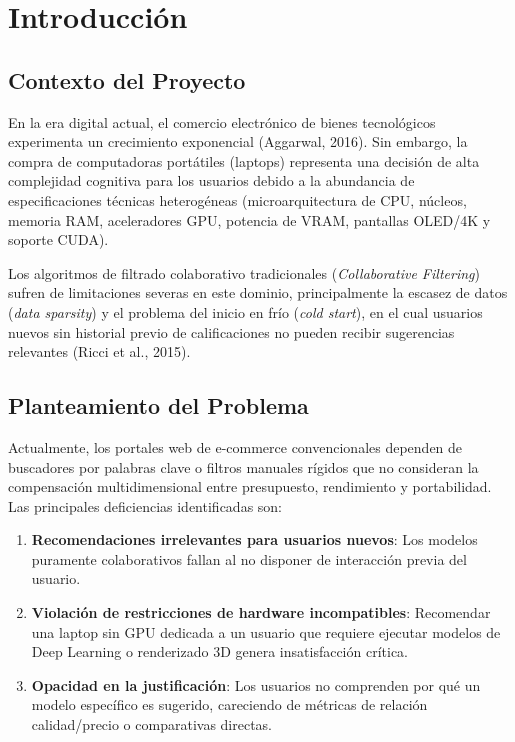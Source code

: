 \documentclass[12pt,a4paper]{article}
\begin{document}
\section{Introducción}

\subsection{Contexto del Proyecto}
En la era digital actual, el comercio electrónico de bienes tecnológicos experimenta un crecimiento exponencial (Aggarwal, 2016). Sin embargo, la compra de computadoras portátiles (laptops) representa una decisión de alta complejidad cognitiva para los usuarios debido a la abundancia de especificaciones técnicas heterogéneas (microarquitectura de CPU, núcleos, memoria RAM, aceleradores GPU, potencia de VRAM, pantallas OLED/4K y soporte CUDA). 

Los algoritmos de filtrado colaborativo tradicionales (\textit{Collaborative Filtering}) sufren de limitaciones severas en este dominio, principalmente la escasez de datos (\textit{data sparsity}) y el problema del inicio en frío (\textit{cold start}), en el cual usuarios nuevos sin historial previo de calificaciones no pueden recibir sugerencias relevantes (Ricci et al., 2015).

\subsection{Planteamiento del Problema}
Actualmente, los portales web de e-commerce convencionales dependen de buscadores por palabras clave o filtros manuales rígidos que no consideran la compensación multidimensional entre presupuesto, rendimiento y portabilidad. Las principales deficiencias identificadas son:
\begin{enumerate}
    \item \textbf{Recomendaciones irrelevantes para usuarios nuevos}: Los modelos puramente colaborativos fallan al no disponer de interacción previa del usuario.
    \item \textbf{Violación de restricciones de hardware incompatibles}: Recomendar una laptop sin GPU dedicada a un usuario que requiere ejecutar modelos de Deep Learning o renderizado 3D genera insatisfacción crítica.
    \item \textbf{Opacidad en la justificación}: Los usuarios no comprenden por qué un modelo específico es sugerido, careciendo de métricas de relación calidad/precio o comparativas directas.
\end{enumerate}
\end{document}
